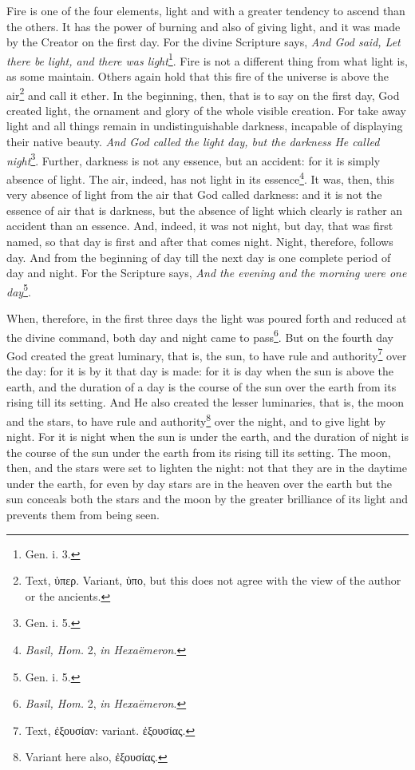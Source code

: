 Fire is one of the four elements, light and with a greater tendency to ascend than the others. It has the power of burning and also of giving light, and it was made by the Creator on the first day. For the divine Scripture says, \emph{And God said, Let there be light, and there was light}\footnote{Gen. i. 3.}. Fire is not a different thing from what light is, as some maintain. Others again hold that this fire of the universe is above the air\footnote{Text, \textgreek{ὑπερ}. Variant, \textgreek{ὑπο}, but this does not agree with the view of the author or the ancients.} and call it ether. In the beginning, then, that is to say on the first day, God created light, the ornament and glory of the whole visible creation. For take away light and all things remain in undistinguishable darkness, incapable of displaying their native beauty. \emph{And God called the light day, but the darkness }\emph{He called night}\footnote{Gen. i. 5.}. Further, darkness is not any essence, but an accident: for it is simply absence of light. The air, indeed, has not light in its essence\footnote{\emph{Basil, Hom.} 2, \emph{in Hexaëmeron}.}. It was, then, this very absence of light from the air that God called darkness: and it is not the essence of air that is darkness, but the absence of light which clearly is rather an accident than an essence. And, indeed, it was not night, but day, that was first named, so that day is first and after that comes night. Night, therefore, follows day. And from the beginning of day till the next day is one complete period of day and night. For the Scripture says, \emph{And the evening and the morning were one day}\footnote{Gen. i. 5.}.

When, therefore, in the first three days the light was poured forth and reduced at the divine command, both day and night came to pass\footnote{\emph{Basil, Hom.} 2, \emph{in Hexaëmeron}.}. But on the fourth day God created the great luminary, that is, the sun, to have rule and authority\footnote{Text, \textgreek{ἐξουσίαν}: variant. \textgreek{ἐξουσίας}.} over the day: for it is by it that day is made: for it is day when the sun is above the earth, and the duration of a day is the course of the sun over the earth from its rising till its setting. And He also created the lesser luminaries, that is, the moon and the stars, to have rule and authority\footnote{Variant here also, \textgreek{ἐξουσίας}.} over the night, and to give light by night. For it is night when the sun is under the earth, and the duration of night is the course of the sun under the earth from its rising till its setting. The moon, then, and the stars were set to lighten the night: not that they are in the daytime under the earth, for even by day stars are in the heaven over the earth but the sun conceals both the stars and the moon by the greater brilliance of its light and prevents them from being seen.

